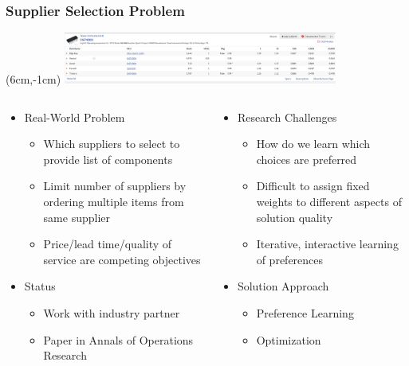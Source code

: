 \begin{frame}
\frametitle{Supplier Selection Problem}
\begin{textblock*}{9cm}(6cm,-1cm)
\includegraphics[width=9cm]{images/sn7400}
\end{textblock*}
\vspace{1cm}
\begin{columns}[b]
\begin{column}{0.5\textwidth}
\begin{itemize}
\item Real-World Problem
\begin{itemize}
\item Which suppliers to select to provide list of components
\item Limit number of suppliers by ordering multiple items from same supplier
\item Price/lead time/quality of service are competing objectives
\end{itemize}
\item Status
\begin{itemize}
\item Work with industry partner
\item Paper in Annals of Operations Research
\end{itemize}
\end{itemize}
\end{column}
\begin{column}{0.5\textwidth}
\begin{itemize}
\item Research Challenges
\begin{itemize}
\item How do we learn which choices are preferred
\item Difficult to assign fixed weights to different aspects of solution quality
\item Iterative, interactive learning of preferences
\end{itemize}
\item Solution Approach
\begin{itemize}
\item Preference Learning
\item Optimization
\end{itemize}
\end{itemize}
\end{column}
\end{columns}
\end{frame}

